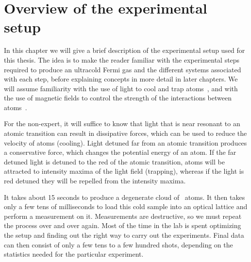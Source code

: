 \chapter{Overview of the experimental setup}
\label{chap:setup-overview}

In this chapter we will give a brief description of the experimental setup used
for this thesis.  The idea is to make the reader familiar with the experimental
steps required to produce an ultracold Fermi gas and the different systems
associated with each step,  before explaining concepts in more detail in later
chapters.  We will assume familiarity with the use of light to cool and trap
atoms~\cite{RevModPhys.70.685,RevModPhys.70.707,RevModPhys.70.721},  and with
the use of magnetic fields to control the strength of the interactions between
atoms~\cite{RevModPhys.82.1225}. 

For the non-expert, it will suffice to know that light that is near resonant to
an atomic transition can result in dissipative forces, which can be used to
reduce the velocity of atoms (cooling).  Light detuned far from an atomic
transition produces a conservative force,  which changes the potential energy
of an atom.  If the far detuned light is detuned to the red of the atomic
transition, atoms will be attracted to intensity maxima of the light field
(trapping), whereas if the light is red detuned they will be repelled from the
intensity maxima. 


It takes about 15 seconds to produce a degenerate cloud of \li\ atoms.  It then
takes only a few tens of milliseconds to load this cold sample into an optical
lattice and perform a measurement on it.  Measurements are destructive, so we
must repeat the process over and over again.   Most of the time in the lab is
spent optimizing the setup and finding out the right way to carry out the
experiments.   Final data can then consist of only a few tens to a few hundred
shots, depending on the statistics needed for the particular experiment. 

